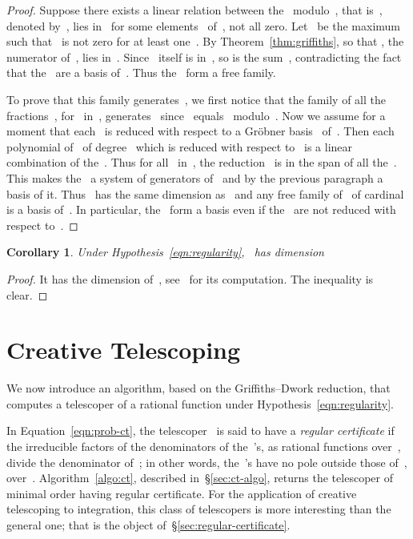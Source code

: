 \documentclass{sig-alternate}
\newtheorem{coro}[thm]{Corollary}
\begin{document}
\begin{proof}
Suppose there exists a linear relation between the~ modulo~, that is~, denoted by~, lies in~ for some elements~ of~, not all zero.
Let~ be the maximum~ such that~ is not zero for at least one~.
By Theorem~\ref{thm:griffiths},  so that 
, the numerator of~, lies in~.
Since~ itself is in~, so is the sum~, contradicting the fact that the~ are a basis of~. 
Thus the~ form a free family.

To prove that this family generates~, we first notice that the family of all the fractions~, for~ in~, generates~ since~ equals~ modulo~.
Now we assume for a moment that each~ is reduced with respect to a Gr\"obner basis~ of~.
Then each polynomial of~ of degree~ which is reduced with respect to~ is a linear combination of the~.
Thus for all~ in~, the reduction~ is in the span of all the~. This makes the~ a system of generators of~ and by the previous paragraph a basis of it. Thus~ has the same dimension as~ and
any free family of~ of cardinal~ is a basis of~.
In particular, the~ form a basis even if the~ are not reduced with respect to~.
\end{proof}

\begin{coro}\label{coro:hdim}
  Under Hypothesis~\eqref{eqn:regularity},~ has dimension
  
\end{coro}

\begin{proof}
It has the dimension of~, see~\cite[thm. 8.3]{Mon70} for its computation. The inequality is clear.
\end{proof}




\section{Creative Telescoping}

\noindent We now introduce an algorithm, based on the Griffiths--Dwork reduction, that computes a telescoper of a rational function under Hypothesis~\eqref{eqn:regularity}.

In Equation~\eqref{eqn:prob-ct}, the telescoper~ is said to have a \emph{regular certificate} if the irreducible factors of the denominators of the~'s, as rational functions over~, divide the denominator of~; in other words, the~'s have no pole outside those of~, over~. 
Algorithm~\ref{algo:ct}, described in~\S\ref{sec:ct-algo}, returns the telescoper of minimal order having regular certificate.
For the application of creative telescoping to integration, this class of telescopers is more interesting than the general one; that is the object of~\S\ref{sec:regular-certificate}.
\end{document}
